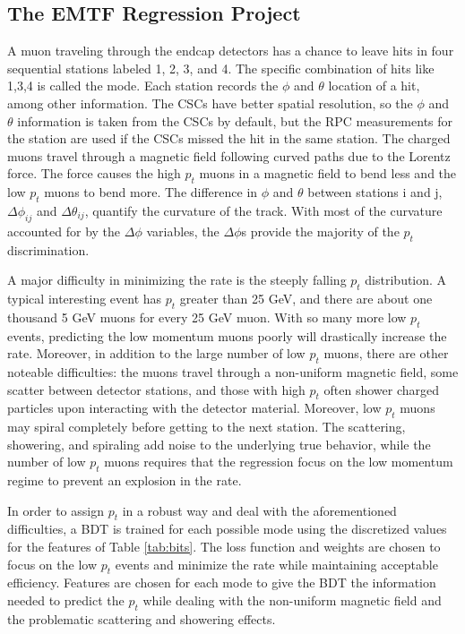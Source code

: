 \subsection{The EMTF Regression Project}

A muon traveling through the endcap detectors has a chance to leave hits in four sequential stations labeled 1, 2, 3, and 4. The specific combination of hits like 1,3,4 is called the mode. Each station records the $\phi$ and $\theta$ location of a hit, among other information. The CSCs have better spatial resolution, so the $\phi$ and $\theta$ information is taken from the CSCs by default, but the RPC measurements for the station are used if the CSCs missed the hit in the same station. The charged muons travel through a magnetic field following curved paths due to the Lorentz force. The force causes the high $p_t$ muons in a magnetic field to bend less and the low $p_t$ muons to bend more. The difference in $\phi$ and $\theta$ between stations i and j, $\Delta\phi_{ij}$ and $\Delta\theta_{ij}$, quantify the curvature of the track. With most of the curvature accounted for by the $\Delta\phi$ variables, the $\Delta\phi$s provide the majority of the $p_t$ discrimination.

A major difficulty in minimizing the rate is the steeply falling $p_t$ distribution. A typical interesting event has $p_t$ greater than 25 GeV, and there are about one thousand 5 GeV muons for every 25 GeV muon. With so many more low $p_t$ events, predicting the low momentum muons poorly will drastically increase the rate. Moreover, in addition to the large number of low $p_t$ muons, there are other noteable difficulties: the muons travel through a non-uniform magnetic field, some scatter between detector stations, and those with high $p_t$ often shower charged particles upon interacting with the detector material. Moreover, low $p_t$ muons may spiral completely before getting to the next station. The scattering, showering, and spiraling add noise to the underlying true behavior, while the number of low $p_t$ muons requires that the regression focus on the low momentum regime to prevent an explosion in the rate.

In order to assign $p_t$ in a robust way and deal with the aforementioned difficulties, a BDT is trained for each possible mode using the discretized values for the features of Table \ref{tab:bits}. The loss function and weights are chosen to focus on the low $p_t$ events and minimize the rate while maintaining acceptable efficiency. Features are chosen for each mode to give the BDT the information needed to predict the $p_t$ while dealing with the non-uniform magnetic field and the problematic scattering and showering effects.

